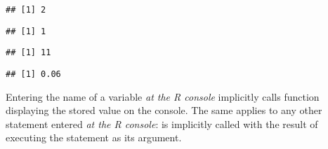 \documentclass[krantz2]{krantz}\usepackage{knitr}
\begin{document}
\begin{knitrout}\footnotesize
{}\color{fgcolor}\begin{kframe}
\begin{alltt}
 \hlkwb{<-} 
 \hlopt{+} 
\end{alltt}
\begin{verbatim}
## [1] 2
\end{verbatim}
\begin{alltt}
\end{alltt}
\begin{verbatim}
## [1] 1
\end{verbatim}
\begin{alltt}
 \hlkwb{<-} 
 \hlkwb{<-}  \hlopt{+} 
\end{alltt}
\begin{verbatim}
## [1] 11
\end{verbatim}
\begin{alltt}
 \hlopt{*} 
\end{alltt}
\begin{verbatim}
## [1] 0.06
\end{verbatim}
\end{kframe}
\end{knitrout}

Entering the name of a variable \emph{at the R console} implicitly calls function  displaying the stored value on the console. The same applies to any other statement entered \emph{at the R console}:  is implicitly called with the result of executing the statement as its argument.
\end{document}
